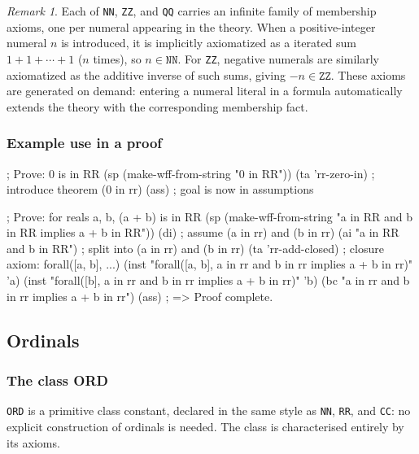 \documentclass{amsbook}[openany]
\theoremstyle{definition}
\theoremstyle{remark}
\newtheorem{remark}{Remark}[chapter]
\theoremstyle{remark}
\begin{document}
\begin{remark}
Each of \texttt{NN}, \texttt{ZZ}, and \texttt{QQ} carries an infinite
family of membership axioms, one per numeral appearing in the theory.
When a positive-integer numeral $n$ is introduced, it is implicitly
axiomatized as a iterated sum $1 + 1 + \cdots + 1$ ($n$ times), so
$n \in \mathtt{NN}$.  For \texttt{ZZ}, negative numerals are similarly
axiomatized as the additive inverse of such sums, giving $-n \in
\mathtt{ZZ}$.  These axioms are generated on demand: entering a numeral
literal in a formula automatically extends the theory with the
corresponding membership fact.
\end{remark}

\subsubsection{Example use in a proof}

\begin{VNBcode}
; Prove: 0 is in RR
(sp (make-wff-from-string "0 in RR"))
(ta 'rr-zero-in)                ; introduce theorem (0 in rr)
(ass)                           ; goal is now in assumptions

; Prove: for reals a, b, (a + b) is in RR
(sp (make-wff-from-string "a in RR and b in RR implies a + b in RR"))
(di)                              ; assume (a in rr) and (b in rr)
(ai "a in RR and b in RR")       ; split into (a in rr) and (b in rr)
(ta 'rr-add-closed)               ; closure axiom: forall([a, b], ...)
(inst "forall([a, b], a in rr and b in rr implies a + b in rr)" 'a)
(inst "forall([b], a in rr and b in rr implies a + b in rr)" 'b)
(bc "a in rr and b in rr implies a + b in rr")
(ass)
; => Proof complete.
\end{VNBcode}

\subsection{Ordinals}
\label{sec:ordinals}

\subsubsection{The class ORD}

\texttt{ORD} is a primitive class constant, declared in the same style as
\texttt{NN}, \texttt{RR}, and \texttt{CC}: no explicit construction of
ordinals is needed.  The class is characterised entirely by its axioms.
\end{document}
